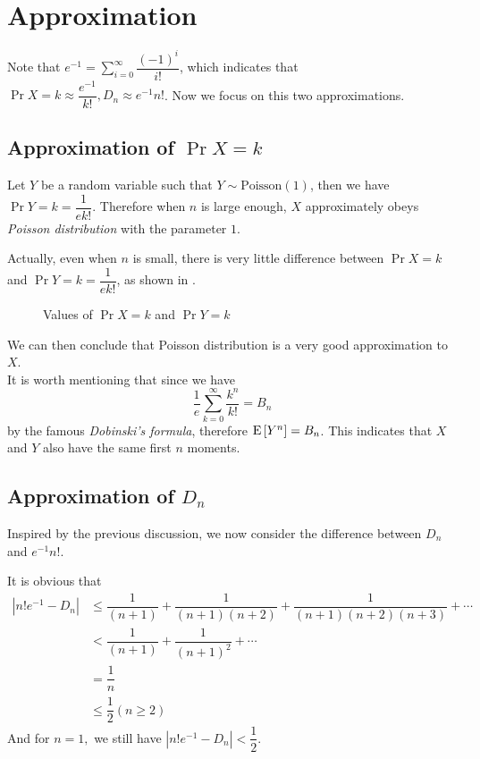 
\section{Approximation}
Note that $ e^{-1} = \sum_{i=0}^{\infty}\dfrac{(-1)^i}{i!}$,
which indicates that $\Pr{X=k}\approx \dfrac{e^{-1}}{k!},D_n \approx e^{-1}n! $. Now we focus on this two approximations.

\subsection{Approximation of $ \Pr{X=k}$}
Let $ Y$ be a random variable such that $ Y\sim \text{Poisson}(1)$, then
we have $ \Pr{Y=k} = \dfrac{1}{ek!}$.
Therefore when $ n$ is large enough,
$ X$ approximately obeys \emph{Poisson distribution} with the parameter $ 1$.

Actually, even when $ n$ is small,
there is very little difference between $ \Pr{X=k}$ and $ \Pr{Y=k}=\dfrac{1}{ek!}$,
as shown in .

\begin{figure}[H]
  \centering
  \caption{Values of $ \Pr{X=k}$ and $ \Pr{Y=k}$\label{fig:diff}}
\end{figure}

We can then conclude that Poisson distribution is a very good approximation to $ X$.
\\

It is worth mentioning that since we have
\[ \dfrac{1}{e}\sum_{k=0}^{\infty}\dfrac{k^n}{k!} = B_n\]
by the famous \emph{Dobinski's formula}\cite{wiki_dob}, therefore $\text{E}\left[Y^n\right] = B_n$. This indicates that $ X$ and
$ Y$ also have the same first $ n$ moments.

\subsection{Approximation of $ D_n$}
Inspired by the previous discussion, we now consider the difference between $ D_n $ and $ e^{-1}n!$.

It is obvious that
\begin{align*}
|n! e^{-1} - D_n| & \le \dfrac{1}{(n+1)}+\dfrac{1}{(n+1)(n+2)}+ \dfrac{1}{(n+1)(n+2)(n+3)}+\cdots \\
&< \dfrac{1}{(n+1)} + \dfrac{1}{(n+1)^2 }+ \cdots  \\
& =\dfrac{1}{n}\\
& \le \dfrac{1}{2} ( n \ge 2)
\end{align*}
And for $ n=1,$ we still have $ |n!e^{-1}-D_n| < \dfrac{1}{2}.$

